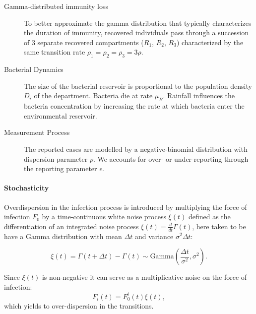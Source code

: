 \begin{description}
    \item[Gamma-distributed immunity loss] To better approximate the gamma distribution that typically characterizes the duration of immunity\cite{King:InapparentInfectionsCholera:2008}, recovered individuals pass through a succession of 3 separate recovered compartments ($R_1$, $R_2$, $R_3$) characterized by the same transition rate $\rho_1=\rho_2=\rho_3=3\rho$.
    \item[Bacterial Dynamics] The size of the bacterial reservoir is proportional to the population density $D_i$ of the department. Bacteria die at rate $\mu_B$. Rainfall influences the bacteria concentration by increasing the rate at which bacteria enter the environmental reservoir.
    \item[Measurement Process] The reported cases are modelled by a negative-binomial distribution with dispersion parameter $p$. We accounts for over- or under-reporting through the reporting parameter $\epsilon$.
\end{description}
    
    
\paragraph{Stochasticity} Overdispersion in the infection process is introduced by multiplying the force of infection $F_0$ by a time-continuous white noise process \(\xi(t)\) defined as the differentiation of an integrated noise process \(\xi(t) = \frac{d}{dt}\Gamma(t)\), here taken to be have a Gamma distribution with mean \(\Delta t\) and variance \(\sigma^2 \Delta t\)\cite{Breto:CompoundMarkovCounting:2011}:

\[
\xi(t) = \Gamma (t+\Delta t) - \Gamma (t) \sim \text{Gamma}\left( \frac{\Delta t}{\sigma^2}, \sigma^2\right).
\]

Since \(\xi(t)\) is non-negative it can serve as a multiplicative noise on
the force of infection: \[
F_i(t) = F^i_0(t) \xi(t),
\]
which yields to over-dispersion in the transitions.


